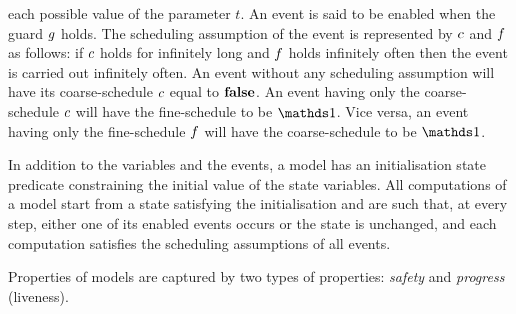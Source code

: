 each possible value of the parameter $t$.  An event is said to be
enabled when the guard $g$ holds.  The scheduling assumption of
the event is represented by $c$ and $f$ as follows: if
$c$ holds for infinitely long and $f$ holds infinitely
often then the event is carried out infinitely often.  An event
without any scheduling assumption will have its coarse-schedule
$c$ equal to $\mathbf{false}$.  An event having only the
coarse-schedule $c$ will have the fine-schedule to be $\one$.
Vice versa, an event having only the fine-schedule $f$ will
have the coarse-schedule to be $\one$.%

In addition to the variables and the events, a model has an
initialisation state predicate \init constraining the initial value of
the state variables.
All computations of a model start from a state satisfying the
initialisation and are such that, at every step, either one of its
enabled events occurs or the state is unchanged, and each computation
satisfies the scheduling assumptions of all events.

Properties of \unitb models are captured by two types of properties:
\emph{safety} and \emph{progress} (liveness).


